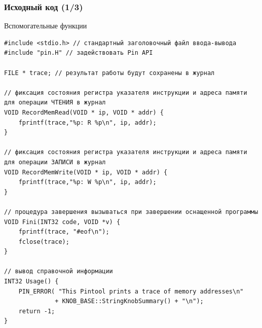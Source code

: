 \documentclass{beamer}
\begin{document}
\begin{frame}[fragile] %
\frametitle{Исходный код (1/3)}

\begin{block}{Вспомогательные функции}
\begin{verbatim}
#include <stdio.h> // стандартный заголовочный файл ввода-вывода
#include "pin.H" // задействовать Pin API

FILE * trace; // результат работы будут сохранены в журнал

// фиксация состояния регистра указателя инструкции и адреса памяти для операции ЧТЕНИЯ в журнал
VOID RecordMemRead(VOID * ip, VOID * addr) {
    fprintf(trace,"%p: R %p\n", ip, addr);
}

// фиксация состояния регистра указателя инструкции и адреса памяти для операции ЗАПИСИ в журнал
VOID RecordMemWrite(VOID * ip, VOID * addr) {
    fprintf(trace,"%p: W %p\n", ip, addr);
}

// процедура завершения вызываться при завершении оснащенной программы
VOID Fini(INT32 code, VOID *v) {
    fprintf(trace, "#eof\n");
    fclose(trace);
}

// вывод справочной информации
INT32 Usage() {
    PIN_ERROR( "This Pintool prints a trace of memory addresses\n" 
              + KNOB_BASE::StringKnobSummary() + "\n");
    return -1;
}
\end{verbatim}
\end{block}
\end{frame}

\end{document}
